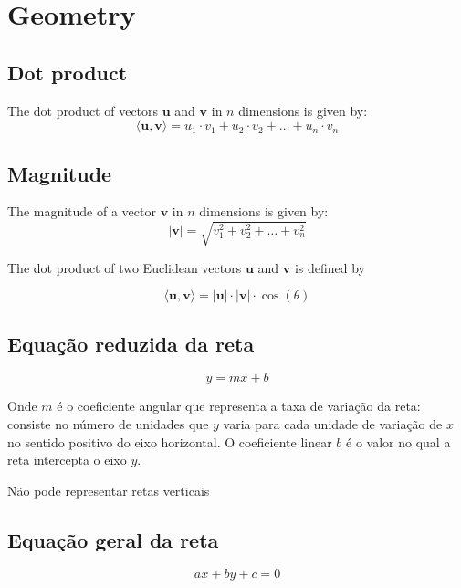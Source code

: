 \section{Geometry}





\subsection{Dot product}
The dot product of vectors $\mathbf{u}$ and $\mathbf{v}$ in $n$ dimensions is given by:
\[
\langle \mathbf{u}, \mathbf{v} \rangle = u_1 \cdot v_1 + u_2 \cdot v_2 + \ldots + u_n \cdot v_n
\]

\subsection{Magnitude}
The magnitude of a vector $\mathbf{v}$ in $n$ dimensions is given by:
\[
|\mathbf{v}| = \sqrt{v_1^2 + v_2^2 + \ldots + v_n^2}
\]

The dot product of two Euclidean vectors $\mathbf{u}$ and $\mathbf{v}$ is defined by

\[
\langle \mathbf{u}, \mathbf{v} \rangle = |\mathbf{u}| \cdot |\mathbf{v}| \cdot \cos(\theta)
\]

\subsection{Equação reduzida da reta}

\begin{equation}
    y = mx + b
\end{equation}

Onde $m$ é o coeficiente angular que representa a taxa de variação da reta: consiste no número de
unidades que $y$ varia para cada unidade de variação de $x$ no sentido positivo do eixo
horizontal. O coeficiente linear $b$ é o valor no qual a reta intercepta o eixo $y$.

Não pode representar retas verticais

\subsection{Equação geral da reta}

\begin{equation}
    ax + by + c = 0
\end{equation}

